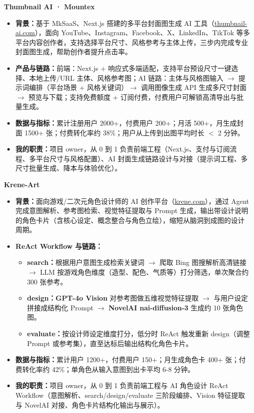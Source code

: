 \documentclass[12pt,a3paper,fontset=none]{ctexart}
\newcommand{\tighturl}[2]{\href{#1}{\uline{#2}}}
\newcommand{\ProjectTitle}[1]{%
  \needspace{2\baselineskip}
  {\color{TitleBlue}\fontsize{13.5pt}{16pt}\selectfont\bfseries #1}\par
  \vspace{0.2mm}
}
\begin{document}
\ProjectTitle{Thumbnail AI · Mountex}
\begin{itemize}
  \item \textbf{背景：}基于 MkSaaS、Next.js 搭建的多平台封面图生成 AI 工具（\tighturl{https://thumbnail-ai.com}{thumbnail-ai.com}），面向 YouTube、Instagram、Facebook、X、LinkedIn、TikTok 等多平台内容创作者，支持选择平台尺寸、风格参考与主体上传，三步内完成专业封面图生成，帮助创作者提升点击率。
  \item \textbf{产品与链路：}前端：Next.js + 响应式多端适配，支持平台预设尺寸一键选择、本地上传/URL 主体、风格参考图；AI 链路：主体与风格图输入 $\rightarrow$ 提示词编排（平台场景 + 风格关键词）$\rightarrow$ 调用图像生成 API 生成多尺寸封面 $\rightarrow$ 预览与下载；支持免费额度 + 订阅付费，付费用户可解锁高清导出与批量生成。
  \item \textbf{数据与指标：}累计注册用户 2000+，付费用户 200+；月活 500+，月生成封面 1500+ 张；付费转化率约 38\%；用户从上传到出图平均时长 $<$ 2 分钟。
  \item \textbf{我的职责：}项目 owner，从 0 到 1 负责前端工程（Next.js、支付与订阅流程、多平台尺寸与风格配置）、AI 封面生成链路设计与对接（提示词工程、多尺寸批量生成、降本与体验优化）。
\end{itemize}

\ProjectTitle{Krene-Art}
\begin{itemize}
  \item \textbf{背景：}面向游戏/二次元角色设计师的 AI 创作平台（\tighturl{https://krene.com}{krene.com}），通过 Agent 完成意图解析、参考图检索、视觉特征提取与 Prompt 生成，输出带设计说明的角色卡片（含核心设定、概念整合与角色立绘），缩短从脑洞到成图的设计周期。
  \item \textbf{ReAct Workflow 与链路：}
  \begin{itemize}
    \item \textbf{search：}根据用户意图生成检索关键词 $\rightarrow$ 爬取 Bing 图搜解析高清链接 $\rightarrow$ LLM 按游戏角色维度（造型、配色、气质等）打分筛选，单次聚合约 300 张参考。
    \item \textbf{design：GPT-4o Vision} 对参考图做五维视觉特征提取 $\rightarrow$ 与用户设定拼接成结构化 Prompt $\rightarrow$ \textbf{NovelAI nai-diffusion-3} 生成约 10 张角色图。
    \item \textbf{evaluate：}按设计师设定维度打分，低分时 ReAct 触发重新 design（调整 Prompt 或参考集），直至达标后输出结构化角色卡片。
  \end{itemize}
  \item \textbf{数据与指标：}累计用户 1200+，付费用户 150+；月生成角色卡 400+ 张；付费转化率约 42\%；单角色从输入意图到出卡平均 6-8 分钟。
  \item \textbf{我的职责：}项目 owner，从 0 到 1 负责前端工程与 AI 角色设计 ReAct Workflow（意图解析、search/design/evaluate 三阶段编排、Vision 特征提取与 NovelAI 对接、角色卡片结构化输出与展示）。
\end{itemize}
\end{document}
